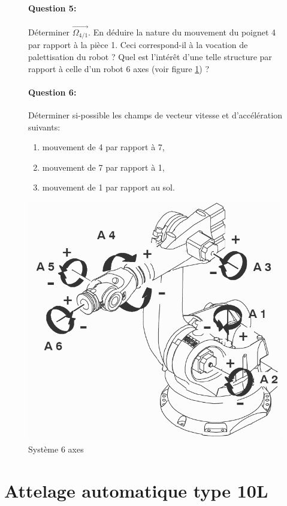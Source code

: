 \begin{figure}[!h]
 \begin{minipage}{0.6\linewidth}
\paragraph{Question 5:} Déterminer $\overrightarrow{\Omega_{4/1}}$. En déduire la nature du mouvement du poignet 4 par rapport à la pièce 1.
Ceci correspond-il à la vocation de palettisation du robot ? Quel est l'intérêt d'une telle structure par rapport à celle d'un robot 6 axes (voir figure \ref{img:image5}) ?

\paragraph{Question 6:} Déterminer si-possible les champs de vecteur vitesse et d'accélération suivants:
\begin{enumerate}
 \item mouvement de 4 par rapport à 7,
 \item mouvement de 7 par rapport à 1,
 \item mouvement de 1 par rapport au sol.
\end{enumerate}
\end{minipage}
\hfill
 \begin{minipage}{0.35\linewidth}
  \centering\includegraphics[width=0.6\linewidth]{img/6axes.png}
  \caption{Système 6 axes}
  \label{img:image5}
 \end{minipage}
\end{figure}




\section{Attelage automatique type 10L}


